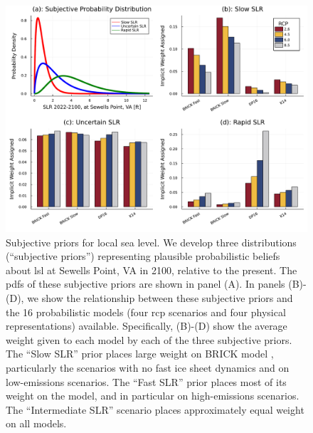 \documentclass[12pt]{article}
\begin{document}
\begin{figure}
    \centering
    \includegraphics[width=\textwidth]{lsl-priors-weights}
    \caption{
        Subjective priors for local sea level.
        We develop three distributions (``subjective priors'') representing plausible probabilistic beliefs about \gls{lsl} at Sewells Point, VA in 2100, relative to the present.
        The \glspl{pdf} of these subjective priors are shown in panel (A).
        In panels (B)-(D), we show the relationship between these subjective priors and the 16 probabilistic models (four \gls{rcp} scenarios and four physical representations) available.
        Specifically, (B)-(D) show the average weight given to each model by each of the three subjective priors.
        The ``Slow SLR'' prior places large weight on BRICK model \citep{wong_brick0.2:2017}, particularly the scenarios with no fast ice sheet dynamics and on low-emissions scenarios.
        The ``Fast SLR'' prior places most of its weight on the \citet{deconto_antarctica:2016} model, and in particular on high-emissions scenarios.
        The ``Intermediate SLR'' scenario places approximately equal weight on all models.
    }\label{fig:lsl-priors-weights}
\end{figure}
\end{document}
